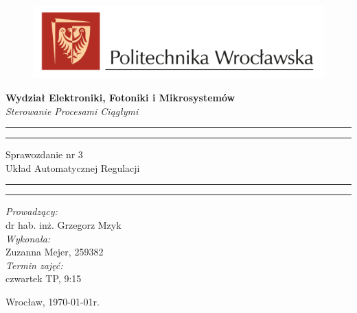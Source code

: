 \begin{titlepage}
\begin{figure}
    \centering
    \includegraphics[width=18cm]{../../logo-PWr.png}
    \label{fig:pwr}
\end{figure}
    \begin{center}
        \LARGE \textbf{ Wydział Elektroniki, Fotoniki i Mikrosystemów }\\ 
        \vspace{70pt}
        \Huge \textit{ Sterowanie Procesami Ciągłymi}  \\
    \end{center}
    \vspace{30pt}
    \hrule
    \vspace{1pt}
    \hrule
    \begin{center}
        {\fontsize{30}{50}\selectfont Sprawozdanie nr 3\\ }
        \vspace{10pt}
        {\fontsize{25}{25}\selectfont Układ Automatycznej Regulacji  }
    \end{center}
    \hrule
    \vspace{1pt}
    \hrule
    \begin{flushright}
        \vspace{50pt}

        \textit{\Large Prowadzący:}\\
        \Large dr hab. inż. Grzegorz Mzyk\\
        \vspace{10pt}
        \textit{\Large Wykonała:}\\
        \Large Zuzanna Mejer, 259382 \\
        \vspace{10pt}
        \textit{\Large Termin zajęć:}\\
        \Large czwartek TP, 9:15\\
        \vspace{10pt}
    
    \end{flushright}
    \vspace{60pt}
    \begin{center}
        \large Wrocław, \today r.
    \end{center}
\end{titlepage}
    
    
